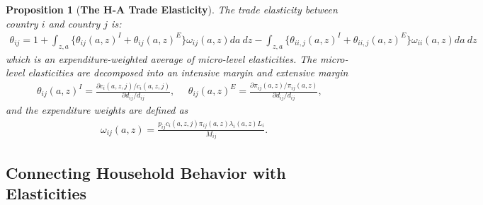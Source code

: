 \documentclass[12pt,pdftex]{article}
\newtheorem{prp}{Proposition}
\begin{document}
\begin{onehalfspacing}
\setcounter{prp}{2}
\begin{prp}[\textbf{The H-A Trade Elasticity}]The trade elasticity between country $i$ and country $j$ is:
{\footnotesize
\begin{align}
\theta_{ij} = 1 + \int_{z,a} \bigg \{ \theta_{ij}(a,z)^{I} + \theta_{ij}(a,z)^{E} \bigg \}\omega_{ij}(a,z)da \ dz - \int_{z,a} \bigg \{ \theta_{ii,j}(a,z)^{I} + \theta_{ii,j}(a,z)^{E} \bigg \}\omega_{ii}(a,z)da \ dz
\label{apx-eq:trade-elasticity}
\end{align}
}which is an expenditure-weighted average of micro-level elasticities. The micro-level elasticities are decomposed into an intensive margin and extensive margin
{\footnotesize
\begin{align}
\nonumber
\theta_{ij}(a,z)^{I} = \frac{\partial c_{i}(a,z,j)/ c_{i}(a,z,j)}{\partial d_{ij} / d_{ij}}, \ \ \ \ \ \ \theta_{ij}(a,z)^{E} = \frac{\partial \pi_{ij}(a,z) / \pi_{ij}(a,z)}{\partial d_{ij} / d_{ij}}, \ \ \ \
\end{align}
}
and the expenditure weights are defined as
{\footnotesize
\begin{align}
\nonumber
\omega_{ij}(a,z) = \frac{p_{ij}c_{i}(a,z,j)\pi_{ij}(a,z) \lambda_{i}(a,z) L_i}{M_{ij}}.
\end{align}
}
\end{prp}

\subsection{Connecting Household Behavior with Elasticities}


\end{onehalfspacing}
\end{document}
